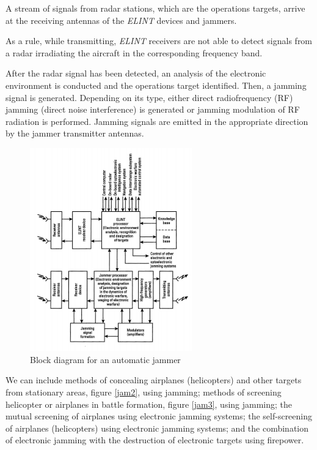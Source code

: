 \documentclass[english,purist]{ist-report}
\begin{document}
A stream of signals from radar stations, which are the operations targets, arrive at the receiving antennas of the \textit{ELINT} devices and jammers. 

As a rule, while transmitting, \textit{ELINT} receivers are not able to detect signals from a radar irradiating the aircraft in the corresponding frequency band. 

After the radar signal has been detected, an analysis of the electronic environment is conducted and the operations target identified. Then, a jamming signal is generated. Depending on its type, either direct radiofrequency (RF) jamming (direct noise interference) is generated or jamming modulation of RF radiation is performed. Jamming signals are emitted in the appropriate direction by the jammer transmitter antennas. 



\begin{figure}[ht]
\centering
\includegraphics[width=70mm]{jam1.png}
\caption{Block diagram for an automatic jammer}
\label{jam1}
\end{figure} 

We can include methods of concealing airplanes (helicopters) and other targets from stationary areas, figure \ref{jam2}, using jamming; methods of screening helicopter or airplanes in battle formation, figure \ref{jam3}, using jamming; the mutual screening of airplanes
using electronic jamming systems; the self-screening of airplanes (helicopters) using electronic jamming systems; and the combination of electronic jamming with the destruction of electronic targets using firepower. 
\end{document}
